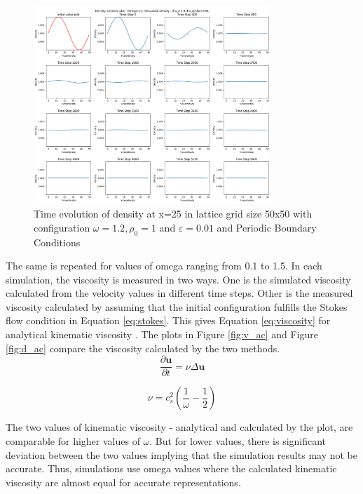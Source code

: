 \documentclass[a4paper,11pt]{report}
\begin{document}
\begin{figure}[h!]
  \begin{center}
   \includegraphics[width=0.8\textwidth]{HPC_report/images/shear_wave_decay/sinusoidal_density/Decay-Y-coordinate-Density.png}
   \caption{Time evolution of density at x=25 in lattice grid size 50x50 with configuration $\omega = 1.2, \rho_0 = 1$ and $\varepsilon = 0.01$ and Periodic Boundary Conditions}
  \label{fig:swd_sd_ind}
  \end{center}
\end{figure} 


The same is repeated for values of omega ranging from 0.1 to 1.5. In each simulation, the viscosity is measured in two ways. One is the simulated viscosity calculated from the velocity values in different time steps. Other is the measured viscosity calculated by assuming that the initial configuration fulfills the Stokes flow condition in Equation \ref{eq:stokes}. This gives Equation \ref{eq:viscosity} for analytical kinematic viscosity \cite{Krueger2017TheLB}. The plots in Figure \ref{fig:v_ac} and Figure \ref{fig:d_ac} compare the viscosity calculated by the two methods.
\begin{equation}
    \frac{\partial \mathbf{u}} {\partial t} = \nu \Delta \mathbf{u}
    \label{eq:stokes}
\end{equation}

\begin{equation}
    \nu = c^2_s \left( \frac1 {\omega} - \frac1 2 \right)
    \label{eq:viscosity}
\end{equation}

The two values of kinematic viscosity - analytical and calculated by the plot, are comparable for higher values of $\omega$. But for lower values, there is significant deviation between the two values implying that the simulation results may not be accurate. Thus, simulations use omega values where the calculated kinematic viscosity are almost equal for accurate representations.
\end{document}
